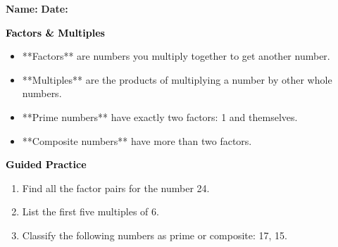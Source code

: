 \documentclass[12pt, letterpaper, fleqn]{article}
\begin{document}
\textbf{Name:} \underline{\hspace{5cm}}
\hfill
\textbf{Date:} \underline{\hspace{3cm}}\\

\begin{tcolorbox}[colback=customteal!20]
    \large\textcolor{black}{\textbf{Factors \& Multiples}}
\end{tcolorbox}

\vspace{3mm}
\begin{itemize}
    \item **Factors** are numbers you multiply together to get another number.
    \item **Multiples** are the products of multiplying a number by other whole numbers.
    \item **Prime numbers** have exactly two factors: 1 and themselves.
    \item **Composite numbers** have more than two factors.
\end{itemize}

\newpage
\begin{tcolorbox}[colback=customteal!20]
    \large\textcolor{black}{\textbf{Guided Practice}}
\end{tcolorbox}

\vspace{5mm}
\begin{enumerate}[itemsep=3.5cm, leftmargin=0.6cm]
\item Find all the factor pairs for the number 24.
\vspace{3cm}

\item List the first five multiples of 6.
\vspace{3cm}

\item Classify the following numbers as prime or composite: 17, 15.
\end{enumerate}
\end{document}
